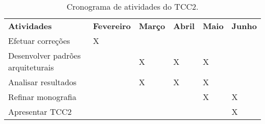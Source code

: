 \begin{table}[h]
 \centering \tiny
 {\renewcommand\arraystretch{1.25}
 \caption{Cronograma de atividades do TCC2.}
 \label{tab:cronograma_2}
 \begin{tabular}{ l l l l l l }
  \cline{1-1}\cline{2-2}\cline{3-3}\cline{4-4}\cline{5-5}\cline{6-6}  
    \multicolumn{1}{p{4.750cm}|}{\textbf{Atividades} \centering } &
    \multicolumn{1}{p{1.383cm}|}{\textbf{Fevereiro} \centering } &
    \multicolumn{1}{p{1.383cm}|}{\textbf{Março} \centering } &
    \multicolumn{1}{p{1.400cm}|}{\textbf{Abril} \centering } &
    \multicolumn{1}{p{1.417cm}|}{\textbf{Maio} \centering } &
    \multicolumn{1}{p{1.400cm}}{\textbf{Junho} \centering }
  \\  
  \cline{1-1}\cline{2-2}\cline{3-3}\cline{4-4}\cline{5-5}\cline{6-6}  
    \multicolumn{1}{p{4.750cm}|}{Efetuar correções \centering } &
    \multicolumn{1}{p{1.383cm}|}{X \centering } &
    \multicolumn{1}{p{1.383cm}|}{  \centering } &
    \multicolumn{1}{p{1.400cm}|}{  \centering } &
    \multicolumn{1}{p{1.417cm}|}{  \centering } &
    \multicolumn{1}{p{1.400cm}}{  \centering }
  \\  
    \multicolumn{1}{p{4.750cm}|}{Desenvolver padrões arquiteturais \centering } &
    \multicolumn{1}{p{1.383cm}|}{  \centering } &
    \multicolumn{1}{p{1.383cm}|}{X \centering } &
    \multicolumn{1}{p{1.400cm}|}{X \centering } &
    \multicolumn{1}{p{1.417cm}|}{X \centering } &
    \multicolumn{1}{p{1.400cm}}{  \centering }
  \\  
    \multicolumn{1}{p{4.750cm}|}{Analisar resultados \centering } &
    \multicolumn{1}{p{1.383cm}|}{  \centering } &
    \multicolumn{1}{p{1.383cm}|}{X \centering } &
    \multicolumn{1}{p{1.400cm}|}{X \centering } &
    \multicolumn{1}{p{1.417cm}|}{X \centering } &
    \multicolumn{1}{p{1.400cm}}{  \centering }
  \\  
    \multicolumn{1}{p{4.750cm}|}{Refinar monografia \centering } &
    \multicolumn{1}{p{1.383cm}|}{  \centering } &
    \multicolumn{1}{p{1.383cm}|}{  \centering } &
    \multicolumn{1}{p{1.400cm}|}{  \centering } &
    \multicolumn{1}{p{1.417cm}|}{X \centering } &
    \multicolumn{1}{p{1.400cm}}{X \centering }
  \\  
    \multicolumn{1}{p{4.750cm}|}{Apresentar TCC2 \centering } &
    \multicolumn{1}{p{1.383cm}|}{  \centering } &
    \multicolumn{1}{p{1.383cm}|}{  \centering } &
    \multicolumn{1}{p{1.400cm}|}{  \centering } &
    \multicolumn{1}{p{1.417cm}|}{  \centering } &
    \multicolumn{1}{p{1.400cm}}{X \centering }
  \\
  \hline

 \end{tabular} }
\end{table}



